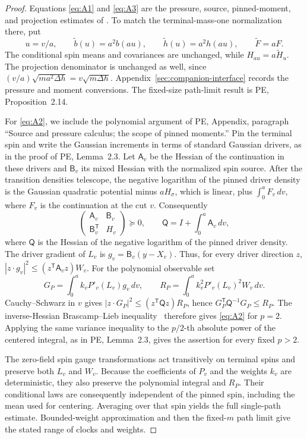 \begin{proof}
Equations \eqref{eq:A1} and \eqref{eq:A3} are the pressure, source,
pinned-moment, and projection estimates of \cite[Lemmas~2.1--2.3
and~3.5, equations~(1) and~(13)]{PE}. To match the terminal-mass-one
normalization there, put
\[
 u=v/a,\qquad \widetilde b(u)=a^2b(au),\qquad
 \widetilde h(u)=a^2h(au),\qquad \widetilde F=aF.
\]
The conditional spin means and covariances are unchanged, while
\(H_{au}=a\widetilde H_u\). The projection denominator is unchanged
as well, since \((v/a)\sqrt{m a^2\Delta h}=v\sqrt{m\Delta h}\).
Appendix~\ref{sec:companion-interface} records the pressure and moment
conversions. The fixed-size path-limit result is PE, Proposition~2.14.

For \eqref{eq:A2}, we include the polynomial argument of PE,
Appendix, paragraph ``Source and pressure calculus; the scope of pinned
moments.'' Pin the terminal spin and write the Gaussian increments in
terms of standard Gaussian drivers, as in the proof of PE, Lemma~2.3. Let \(\mathsf A_v\) be the Hessian of the continuation
in these drivers and \(\mathsf B_v\) its mixed Hessian with the
normalized spin source. After the transition densities telescope, the
negative logarithm of the pinned driver density is the Gaussian
quadratic potential minus \(aH_\sigma\), which is linear, plus
\(\int_0^a F_v\,dv\), where \(F_v\) is the continuation at the cut
\(v\). Consequently
\[
 \begin{pmatrix}\mathsf A_v&\mathsf B_v\\
 \mathsf B_v^{\mathsf T}&H_v\end{pmatrix}\succeq0,
 \qquad
 \mathsf Q=I+\int_0^a\mathsf A_v\,dv,
\]
where \(\mathsf Q\) is the Hessian of the negative logarithm of the
pinned driver density. The driver gradient of \(L_v\) is
\(g_v=\mathsf B_v(y-X_v)\). Thus, for every driver direction \(z\),
\( |z\cdot g_v|^2\le(z^{\mathsf T}\mathsf A_vz)W_v\).
For the polynomial observable set
\[
 G_P=\int_0^a k_vP'_v(L_v)g_v\,dv,
 \qquad R_P=\int_0^a k_v^2P'_v(L_v)^2W_v\,dv.
\]
Cauchy--Schwarz in \(v\) gives
\( |z\cdot G_P|^2\le(z^{\mathsf T}\mathsf Qz)R_P\), hence
\(G_P^{\mathsf T}\mathsf Q^{-1}G_P\le R_P\).
The inverse-Hessian Brascamp--Lieb inequality~\cite[Theorem~4.1]{BL1976}
therefore gives \eqref{eq:A2} for \(p=2\). Applying the same variance
inequality to the \(p/2\)-th absolute power of the centered integral,
as in PE, Lemma~2.3, gives the assertion for every fixed \(p>2\).

The zero-field spin gauge transformations act transitively on terminal
spins and preserve both \(L_v\) and \(W_v\). Because the coefficients of \(P_v\) and the weights \(k_v\)
are deterministic, they also preserve the polynomial integral and
\(R_P\). Their conditional laws are consequently independent of the
pinned spin, including the mean used for centering. Averaging over that
spin yields the full single-path estimate. Bounded-weight approximation
and then the fixed-\(m\) path limit give the stated range of clocks
and weights.


\end{proof}
